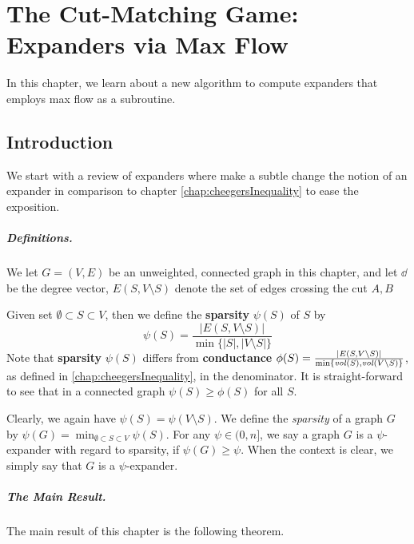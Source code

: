 
\chapter{The Cut-Matching Game: Expanders via Max Flow}

In this chapter, we learn about a new algorithm to compute expanders that employs max flow as a subroutine.

\section{Introduction}

We start with a review of expanders where make a subtle change the notion of an expander in comparison to chapter \ref{chap:cheegersInequality} to ease the exposition.

\paragraph{Definitions.} We let $G=(V,E)$ be an unweighted, connected graph in this chapter, and let $\dd$ be the degree vector, $E(S,V \setminus S)$ denote the set of edges crossing the cut $A,B$

Given set $\emptyset \subset S \subset V$, then we define the \textbf{sparsity} $\psi(S)$ of $S$ by
\[
\psi(S) = \frac{|E(S, V \setminus S)|}{ \min\{|S|, |V \setminus S| \} } 
\]
Note that \textbf{sparsity} $\psi(S)$ differs from \textbf{conductance} $\phi(S) = \frac{|E(S, V \setminus S)|}{ \min\{\mathit{vol}(S), \mathit{vol}(V \setminus S) \} }$, as defined in \ref{chap:cheegersInequality}, in the denominator. It is straight-forward to see that in a connected graph $\psi(S) \geq \phi(S)$ for all $S$. 

Clearly, we again have $\psi(S) = \psi(V \setminus S)$. We define the \emph{sparsity} of a graph $G$ by $\psi(G) = \min_{\emptyset \subset S \subset V} \psi(S)$. For any $\psi \in (0, n]$, we say a graph $G$ is a $\psi$-expander with regard to sparsity, if $\psi(G) \geq \psi$. When the context is clear, we simply say that $G$ is a $\psi$-expander. 

\paragraph{The Main Result.} The main result of this chapter is the following theorem.

